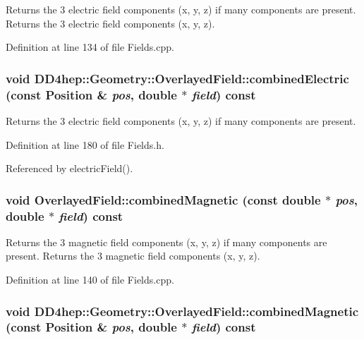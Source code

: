 Returns the 3 electric field components (x, y, z) if many components are present. Returns the 3 electric field components (x, y, z). 

Definition at line 134 of file Fields.cpp.\hypertarget{class_d_d4hep_1_1_geometry_1_1_overlayed_field_a5b4697422c41e1eae7cff779f8ff5dcf}{
\subsubsection[{combinedElectric}]{\setlength{\rightskip}{0pt plus 5cm}void DD4hep::Geometry::OverlayedField::combinedElectric (const {\bf Position} \& {\em pos}, \/  double $\ast$ {\em field}) const}}
\label{class_d_d4hep_1_1_geometry_1_1_overlayed_field_a5b4697422c41e1eae7cff779f8ff5dcf}


Returns the 3 electric field components (x, y, z) if many components are present. 

Definition at line 180 of file Fields.h.

Referenced by electricField().\hypertarget{class_d_d4hep_1_1_geometry_1_1_overlayed_field_aab6c2dd942c5970006201ca7aaee7f23}{
\subsubsection[{combinedMagnetic}]{\setlength{\rightskip}{0pt plus 5cm}void OverlayedField::combinedMagnetic (const double $\ast$ {\em pos}, \/  double $\ast$ {\em field}) const}}
\label{class_d_d4hep_1_1_geometry_1_1_overlayed_field_aab6c2dd942c5970006201ca7aaee7f23}


Returns the 3 magnetic field components (x, y, z) if many components are present. Returns the 3 magnetic field components (x, y, z). 

Definition at line 140 of file Fields.cpp.\hypertarget{class_d_d4hep_1_1_geometry_1_1_overlayed_field_aecc0411ef346abd521b0d3ddbc8a570e}{
\subsubsection[{combinedMagnetic}]{\setlength{\rightskip}{0pt plus 5cm}void DD4hep::Geometry::OverlayedField::combinedMagnetic (const {\bf Position} \& {\em pos}, \/  double $\ast$ {\em field}) const}}
\label{class_d_d4hep_1_1_geometry_1_1_overlayed_field_aecc0411ef346abd521b0d3ddbc8a570e}


